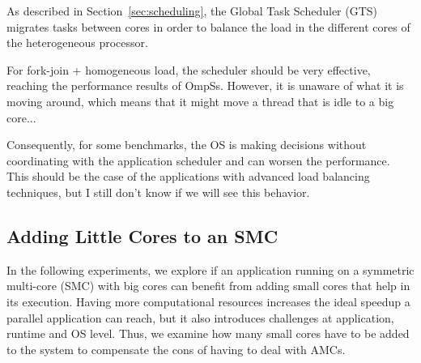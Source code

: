 As described in Section~\ref{sec:scheduling}, the Global Task Scheduler (GTS) migrates tasks between cores in order to balance the load in the different cores of the heterogeneous processor. 

For fork-join + homogeneous load, the scheduler should be very effective, reaching the performance results of OmpSs. However, it is unaware of what it is moving around, which means that it might move a thread that is idle to a big core...

Consequently, for some benchmarks, the OS is making decisions without coordinating with the application scheduler and can worsen the performance. This should be the case of the applications with advanced load balancing techniques, but I still don't know if we will see this behavior.
\fi




\subsection{Adding Little Cores to an SMC}
\label{sec:eval:B}
In the following experiments, we explore if an application running on a symmetric multi-core (SMC) with big cores can benefit from adding small cores that help in its execution. Having more computational resources increases the ideal speedup a parallel application can reach, but it also introduces challenges at application, runtime and OS level. 
Thus, we examine how many small cores have to be added to the system to compensate the cons of having to deal with AMCs.

